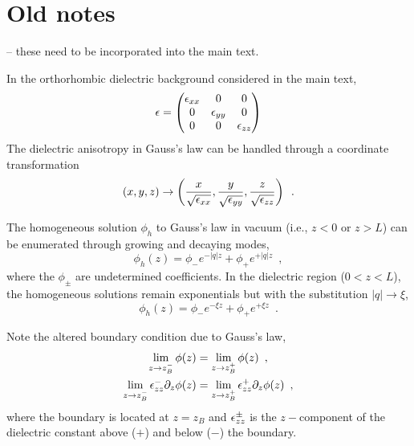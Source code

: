 \section{Old notes}
\label{appendix: Coulomb}


 -- these need to be incorporated into the main text.


In the orthorhombic dielectric background considered in the main text,
\begin{equation}
\epsilon = \begin{pmatrix}
\epsilon_{xx} & 0 & 0
\\ 0 & \epsilon_{yy} & 0
\\ 0 & 0 & \epsilon_{zz}
\end{pmatrix}
\end{equation}
The dielectric anisotropy in Gauss's law can be handled through a coordinate transformation \cite{Mele2001,Ivchenko2021}
\begin{equation}
\left( x,y,z\right) \to \left( \frac{x}{\sqrt{\epsilon_{xx}}}, \frac{y}{\sqrt{\epsilon_{yy}}}, \frac{z}{\sqrt{\epsilon_{zz}}}\right)
\,\,\,.
\end{equation}


The homogeneous solution $\phi_h$ to Gauss's law in vacuum (i.e., $z<0$ or $z>L$) can be enumerated through growing and decaying modes,
\begin{equation}
    \label{app phih vac def}
    \phi_h(z) = \phi_- e^{-|q| z} + \phi_+ e^{+|q| z}
    \,\,\,,
\end{equation}
where the $\phi_{\pm}$ are undetermined coefficients.  In the dielectric region ($0<z<L$), the homogeneous solutions remain exponentials but with the substitution $|q|\to\xi$,
\begin{equation}
    \label{app phih mat def}
    \phi_h(z) = \phi_- e^{-\xi z} + \phi_+ e^{+\xi z}
    \,\,\,.
\end{equation}


Note the altered boundary condition due to Gauss's law,
\begin{align}
    \label{app BC1 def}
    \lim_{z\to z_B^-}\phi(z) &= \lim_{z\to z_B^+}\phi(z)\,\,\,,
    \\ \label{app BC2 def}
    \lim_{z\to z_B^-}\epsilon_{zz}^-\partial_z\phi(z) &= \lim_{z\to z_B^+}\epsilon_{zz}^+\partial_z\phi(z)
    \,\,\,,
\end{align}
where the boundary is located at $z=z_B$ and $\epsilon_{zz}^{\pm}$ is the $z-$component of the dielectric constant above ($+$) and below ($-$) the boundary.